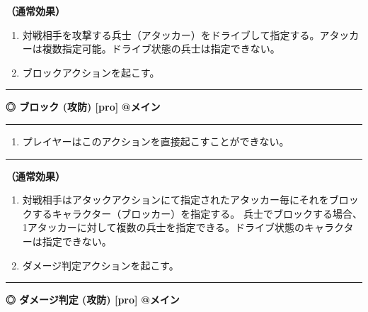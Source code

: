 \documentclass[twocolumn,a5paper,papersize,10pt]{jarticle}
\begin{document}
{\bf（通常効果）}


\vspace{-1zh}%
\begin{enumerate}
\setlength{\leftskip}{-0.3cm}
\setlength{\parskip}{0pt} %

\item 対戦相手を攻撃する兵士（アタッカー）をドライブして指定する。アタッカーは複数指定可能。ドライブ状態の兵士は指定できない。

\item ブロックアクションを起こす。
\vspace{-1zh}%
\end{enumerate}
\vspace{2mm} %
\hrule height 0.5mm depth 0mm width 66.5mm %
\vspace{1mm} %
{\small\bf ◎ ブロック {\scriptsize (攻防) [pro]}} %
\hfill 
{\footnotesize\bf @メイン }


\vspace{1mm}%
\hrule height 0.1mm depth 0mm width 66.5mm %
\vspace{1mm}%


\vspace{-1zh}%
\begin{enumerate}
\renewcommand{\labelenumi}{※}
\setlength{\leftskip}{-0.3cm}
\setlength{\itemsep}{0pt} %
\setlength{\parskip}{0pt} %

\item プレイヤーはこのアクションを直接起こすことができない。

\vspace{-3mm}%
\end{enumerate}
\vspace{1mm}%
\hrule height 0.1mm depth 0mm width 66.5mm %
\vspace{1mm}%

{\bf（通常効果）}


\vspace{-1zh}%
\begin{enumerate}
\setlength{\leftskip}{-0.3cm}
\setlength{\parskip}{0pt} %

\item 対戦相手はアタックアクションにて指定されたアタッカー毎にそれをブロックするキャラクター（ブロッカー）を指定する。 兵士でブロックする場合、1アタッカーに対して複数の兵士を指定できる。ドライブ状態のキャラクターは指定できない。

\item ダメージ判定アクションを起こす。
\vspace{-1zh}%
\end{enumerate}
\vspace{2mm} %
\hrule height 0.5mm depth 0mm width 66.5mm %
\vspace{1mm} %
{\small\bf ◎ ダメージ判定 {\scriptsize (攻防) [pro]}} %
\hfill 
{\footnotesize\bf @メイン }
\end{document}
